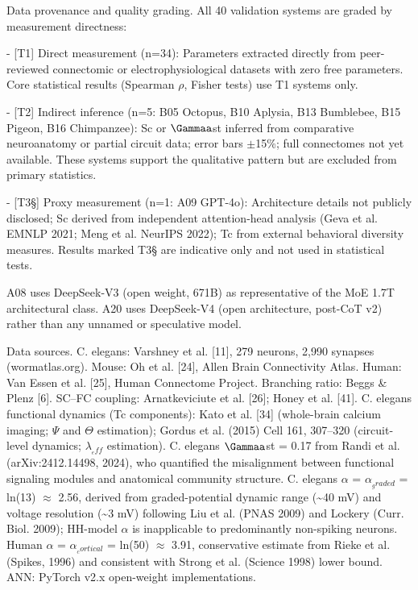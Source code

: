 \documentclass[a4paper,12pt]{article}
\begin{document}
Data provenance and quality grading. All 40 validation systems are graded by measurement directness:


- [T1] Direct measurement (n=34): Parameters extracted directly from peer-reviewed connectomic or electrophysiological datasets with zero free parameters. Core statistical results (Spearman $\rho$, Fisher tests) use T1 systems only.


- [T2\dag] Indirect inference (n=5: B05 Octopus, B10 Aplysia, B13 Bumblebee, B15 Pigeon, B16 Chimpanzee): Sc or $\Gammaa$st inferred from comparative neuroanatomy or partial circuit data; error bars $\pm$15\%; full connectomes not yet available. These systems support the qualitative pattern but are excluded from primary statistics.


- [T3\S{}] Proxy measurement (n=1: A09 GPT-4o): Architecture details not publicly disclosed; Sc derived from independent attention-head analysis (Geva et al. EMNLP 2021; Meng et al. NeurIPS 2022); Tc from external behavioral diversity measures. Results marked T3\S{} are indicative only and not used in statistical tests.


A08 uses DeepSeek-V3 (open weight, 671B) as representative of the MoE 1.7T architectural class. A20 uses DeepSeek-V4 (open architecture, post-CoT v2) rather than any unnamed or speculative model.


Data sources. C. elegans: Varshney et al. [11], 279 neurons, 2,990 synapses (wormatlas.org). Mouse: Oh et al. [24], Allen Brain Connectivity Atlas. Human: Van Essen et al. [25], Human Connectome Project. Branching ratio: Beggs \& Plenz [6]. SC--FC coupling: Arnatkeviciute et al. [26]; Honey et al. [41]. C. elegans functional dynamics (Tc components): Kato et al. [34] (whole-brain calcium imaging; $\Psi$ and $\Theta$ estimation); Gordus et al. (2015) Cell 161, 307--320 (circuit-level dynamics; $\lambda_{_eff}$ estimation). C. elegans $\Gammaa$st = 0.17 from Randi et al. (arXiv:2412.14498, 2024), who quantified the misalignment between functional signaling modules and anatomical community structure. C. elegans $\alpha$ = $\alpha_{_graded}$ = ln(13) $\approx$ 2.56, derived from graded-potential dynamic range (\textasciitilde{}40 mV) and voltage resolution (\textasciitilde{}3 mV) following Liu et al. (PNAS 2009) and Lockery (Curr. Biol. 2009); HH-model $\alpha$ is inapplicable to predominantly non-spiking neurons. Human $\alpha$ = $\alpha_{_cortical}$ = ln(50) $\approx$ 3.91, conservative estimate from Rieke et al. (Spikes, 1996) and consistent with Strong et al. (Science 1998) lower bound. ANN: PyTorch v2.x open-weight implementations.
\end{document}

